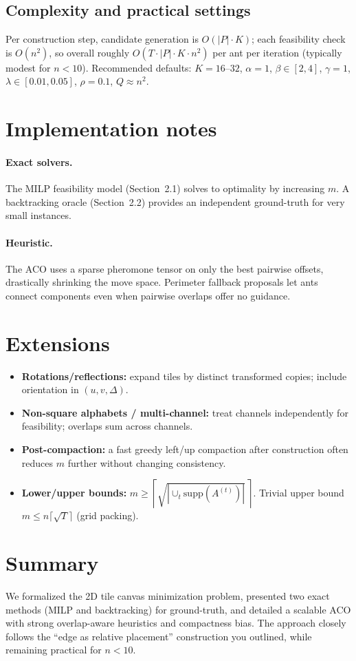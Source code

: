 \documentclass[11pt]{article}
\begin{document}
\subsection{Complexity and practical settings}
Per construction step, candidate generation is $O(|P|\cdot K)$; each feasibility check is $O(n^2)$, so overall roughly $O(T\cdot |P|\cdot K\cdot n^2)$ per ant per iteration (typically modest for $n<10$). Recommended defaults: $K=16\text{--}32$, $\alpha=1$, $\beta\in[2,4]$, $\gamma=1$, $\lambda\in[0.01,0.05]$, $\rho=0.1$, $Q\approx n^2$.

\section{Implementation notes}
\paragraph{Exact solvers.} The MILP feasibility model (Section~2.1) solves to optimality by increasing $m$. A backtracking oracle (Section~2.2) provides an independent ground-truth for very small instances.

\paragraph{Heuristic.} The ACO uses a sparse pheromone tensor on only the best pairwise offsets, drastically shrinking the move space. Perimeter fallback proposals let ants connect components even when pairwise overlaps offer no guidance.

\section{Extensions}
\begin{itemize}
  \item \textbf{Rotations/reflections:} expand tiles by distinct transformed copies; include orientation in $(u,v,\Delta)$.
  \item \textbf{Non-square alphabets / multi-channel:} treat channels independently for feasibility; overlaps sum across channels.
  \item \textbf{Post-compaction:} a fast greedy left/up compaction after construction often reduces $m$ further without changing consistency.
  \item \textbf{Lower/upper bounds:} $m\ge \left\lceil\sqrt{\left|\cup_t \mathrm{supp}(A^{(t)})\right|}\,\right\rceil$. Trivial upper bound $m\le n\lceil\sqrt{T}\rceil$ (grid packing).
\end{itemize}

\section{Summary}
We formalized the 2D tile canvas minimization problem, presented two exact methods (MILP and backtracking) for ground-truth, and detailed a scalable ACO with strong overlap-aware heuristics and compactness bias. The approach closely follows the ``edge as relative placement'' construction you outlined, while remaining practical for $n<10$.
\end{document}
